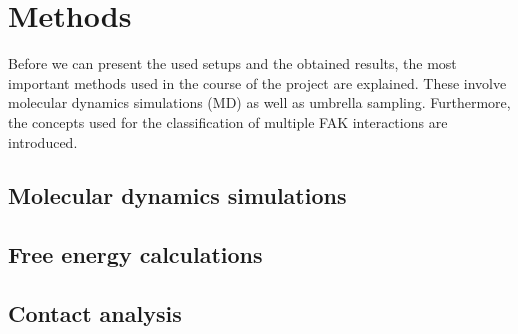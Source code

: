 \chapter{Methods}
Before we can present the used setups and the obtained results, the most important methods used in the course of the project are explained. These involve molecular dynamics simulations (MD) as well as umbrella sampling. Furthermore, the concepts used for the classification of multiple FAK interactions are introduced.
\section{Molecular dynamics simulations}

\section{Free energy calculations}

\section{Contact analysis}
\label{methods:contactana}
